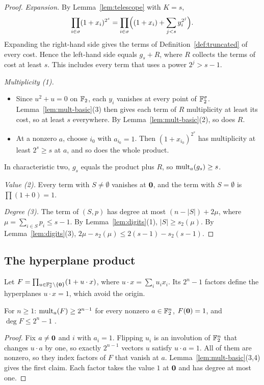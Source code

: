 \begin{proof}
\emph{Expansion.} By Lemma~\ref{lem:telescope} with \(K=s\),
\[
 \prod_{i\in\sigma}(1+x_i)^{2^s}=\prod_{i\in\sigma}\Bigl((1+x_i)+\sum_{j<s}y_i^{2^j}\Bigr).
\]
Expanding the right-hand side gives the terms of Definition~\ref{def:truncated}
of every cost. Hence the left-hand side equals \(g_s+R\), where \(R\) collects the
terms of cost at least \(s\). This includes every term that uses a power
\(2^j>s-1\).

\emph{Multiplicity (1).}
\begin{itemize}
 \item Since \(u^2+u=0\) on \(\mathbb F_2\), each \(y_i\) vanishes at every point of
 \(\mathbb F_2^\sigma\). Lemma~\ref{lem:mult-basic}(3) then gives each term of \(R\)
 multiplicity at least its cost, so at least \(s\) everywhere. By
 Lemma~\ref{lem:mult-basic}(2), so does \(R\).
 \item At a nonzero \(a\), choose \(i_0\) with \(a_{i_0}=1\). Then
 \((1+x_{i_0})^{2^s}\) has multiplicity at least \(2^s\ge s\) at \(a\), and so does
 the whole product.
\end{itemize}
In characteristic two, \(g_s\) equals the product plus \(R\), so
\(\operatorname{mult}_a(g_s)\ge s\).

\emph{Value (2).} Every term with \(S\ne\emptyset\) vanishes at \(\mathbf 0\), and the term
with \(S=\emptyset\) is \(\prod(1+0)=1\).

\emph{Degree (3).} The term of \((S,p)\) has degree at most
\((n-|S|)+2\mu\), where \(\mu=\sum_{i\in S}p_i\le s-1\). By
Lemma~\ref{lem:digits}(1), \(|S|\ge s_2(\mu)\). By Lemma~\ref{lem:digits}(3),
\(2\mu-s_2(\mu)\le2(s-1)-s_2(s-1)\).
\end{proof}

\subsection{The hyperplane product}

Let \(F=\prod_{u\in\mathbb F_2^n\setminus\{\mathbf 0\}}(1+u\cdot x)\), where
\(u\cdot x=\sum_iu_ix_i\). Its \(2^n-1\) factors define the hyperplanes
\(u\cdot x=1\), which avoid the origin.

\begin{lemma}\label{lem:hyperplane-product}
For \(n\ge1\): \(\operatorname{mult}_a(F)\ge2^{n-1}\) for every nonzero \(a\in\mathbb F_2^n\),
\(F(\mathbf 0)=1\), and \(\deg F\le2^n-1\)
.
\end{lemma}

\begin{proof}
Fix \(a\ne\mathbf 0\) and \(i\) with \(a_i=1\). Flipping \(u_i\) is an involution of
\(\mathbb F_2^n\) that changes \(u\cdot a\) by one, so exactly \(2^{n-1}\) vectors \(u\)
satisfy \(u\cdot a=1\). All of them are nonzero, so they index factors of \(F\)
that vanish at \(a\). Lemma~\ref{lem:mult-basic}(3,4) gives the first claim.
Each factor takes the value \(1\) at \(\mathbf 0\) and has degree at most one.
\end{proof}

